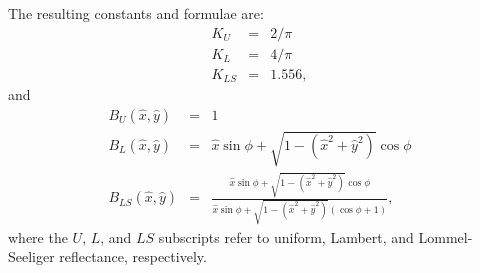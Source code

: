 The resulting constants and formulae are:
\begin{eqnarray}
\nonumber K_U    & = & 2/ \pi \\
\nonumber K_L    & = & 4/ \pi \\
K_{LS} & = & 1.556,
\end{eqnarray}
and
\begin{eqnarray}
\nonumber B_U(\hat{x},\hat{y}) & = & 1 \\
\nonumber B_L(\hat{x},\hat{y}) & = & \hat{x}\sin\phi + \sqrt{1-(\hat{x}^2+\hat{y}^2)}\cos\phi \\
B_{LS}(\hat{x},\hat{y}) & = & \frac{\hat{x}\sin\phi + \sqrt{1-(\hat{x}^2+\hat{y}^2)}\cos\phi}{\hat{x}\sin\phi + \sqrt{1-(\hat{x}^2+\hat{y}^2)}(\cos\phi + 1)},
\end{eqnarray}
%
where the $U$, $L$, and $LS$ subscripts refer to uniform, Lambert, and
Lommel-Seeliger reflectance, respectively.

